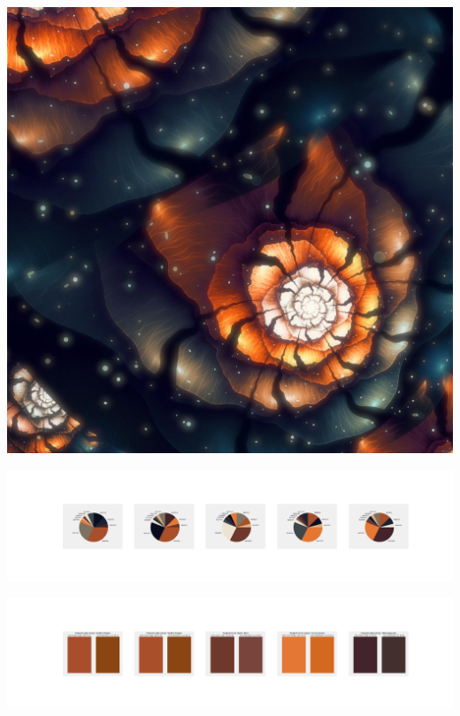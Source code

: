 \documentclass[11pt]{article}
\begin{document}
\begin{landscape}
    \begin{center}
    \includegraphics[width=\textwidth]{./nbimg/file (437).jpg}
    \end{center}

    \begin{center}
    \includegraphics[width=250mm]{./nbimg/pie-375.jpg}
    \end{center}

    \begin{center}
    \includegraphics[width=250mm]{./nbimg/peak-375.jpg}
    \end{center}
    


\end{landscape}
\end{document}
